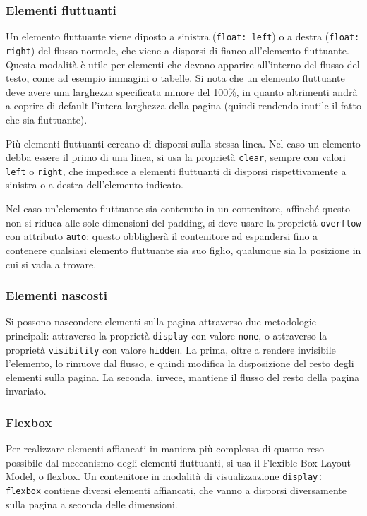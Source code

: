 \documentclass[a4paper,11pt]{article}
\begin{document}
\subsubsection{Elementi fluttuanti}
Un elemento fluttuante viene diposto a sinistra (\lstinline|float: left|) o a destra (\lstinline|float: right|) del flusso normale, che viene a disporsi di fianco all'elemento fluttuante.
Questa modalità è utile per elementi che devono apparire all'interno del flusso del testo, come ad esempio immagini o tabelle.
Si nota che un elemento fluttuante deve avere una larghezza specificata minore del 100\%, in quanto altrimenti andrà a coprire di default l'intera larghezza della pagina (quindi rendendo inutile il fatto che sia fluttuante).

Più elementi fluttuanti cercano di disporsi sulla stessa linea.
Nel caso un elemento debba essere il primo di una linea, si usa la proprietà \lstinline|clear|, sempre con valori \lstinline|left| o \lstinline|right|, che impedisce a elementi fluttuanti di disporsi rispettivamente a sinistra o a destra dell'elemento indicato.

Nel caso un'elemento fluttuante sia contenuto in un contenitore, affinché questo non si riduca alle sole dimensioni del padding, si deve usare la proprietà \lstinline|overflow| con attributo \lstinline|auto|: questo obbligherà il contenitore ad espandersi fino a contenere qualsiasi elemento fluttuante sia suo figlio, qualunque sia la posizione in cui si vada a trovare.

\subsubsection{Elementi nascosti}
Si possono nascondere elementi sulla pagina attraverso due metodologie principali: attraverso la proprietà \lstinline|display| con valore \lstinline|none|, o attraverso la proprietà \lstinline|visibility| con valore \lstinline|hidden|. 
La prima, oltre a rendere invisibile l'elemento, lo rimuove dal flusso, e quindi modifica la disposizione del resto degli elementi sulla pagina.
La seconda, invece, mantiene il flusso del resto della pagina invariato.

\subsubsection{Flexbox}
Per realizzare elementi affiancati in maniera più complessa di quanto reso possibile dal meccanismo degli elementi fluttuanti, si usa il Flexible Box Layout Model, o flexbox.
Un contenitore in modalità di visualizzazione \lstinline|display: flexbox| contiene diversi elementi affiancati, che vanno a disporsi diversamente sulla pagina a seconda delle dimensioni.
\end{document}
